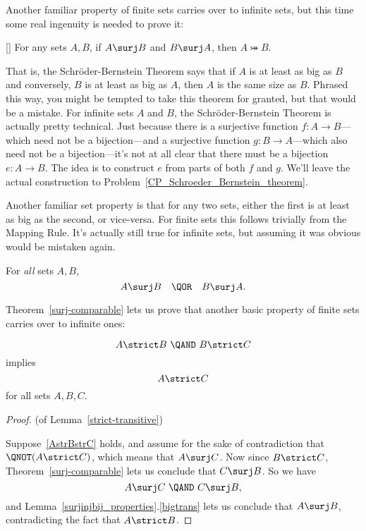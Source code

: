 Another familiar property of finite sets carries over to infinite
sets, but this time some real ingenuity is needed to prove it:
\begin{theorem}\label{S-B_thm} \mbox{}
 [] For any sets $A,B$, if $A \surj B$ and
 $B \surj A$, then $A \bij B$.
\end{theorem}

That is, the Schr\"oder-Bernstein Theorem says that if $A$ is at least
as big as $B$ and conversely, $B$ is at least as big as $A$, then $A$
is the same size as $B$.  Phrased this way, you might be tempted to
take this theorem for granted, but that would be a mistake.  For
infinite sets $A$ and $B$, the Schr\"oder-Bernstein Theorem is
actually pretty technical.  Just because there is a surjective
function $f:A\to B$---which need not be a bijection---and a surjective
function $g:B \to A$---which also need not be a bijection---it's not
at all clear that there must be a bijection $e:A \to B$.  The idea is
to construct $e$ from parts of both $f$ and $g$.  We'll leave the
actual construction to Problem~\ref{CP_Schroeder_Bernstein_theorem}.

Another familiar set property is that for any two sets, either the
first is at least as big as the second, or vice-versa.  For finite
sets this follows trivially from the Mapping Rule.  It's actually
still true for infinite sets, but assuming it was obvious would be
mistaken again.
  \begin{theorem}\label{surj-comparable}
    For \emph{all} sets $A,B$,
    \[
    A \surj B\quad \QOR\quad  B \surj A.
    \]
  \end{theorem}

Theorem~\ref{surj-comparable} lets us prove that another basic
property of finite sets carries over to infinite ones:
\begin{lemma}\label{strict-transitive}
\begin{equation}\label{AstrBstrC}
A \strict B\ \QAND\ B \strict C
\end{equation}
implies
\[
A \strict C
\]
for all sets $A,B,C$.
\end{lemma}

\begin{proof} (of Lemma~\ref{strict-transitive})

Suppose~\ref{AstrBstrC} holds, and assume for the sake of
contradiction that $\QNOT(A \strict C)$, which means that $A \surj C$.
Now since $B \strict C$, Theorem~\ref{surj-comparable} lets us
conclude that $C \surj B$.  So we have
\[
A \surj C\ \QAND\ C \surj B,
\]
and Lemma~\ref{surjinjbij_properties}.\ref{bigtrans} lets us conclude
that $A \surj B$, contradicting the fact that $A \strict B$.
\end{proof}


